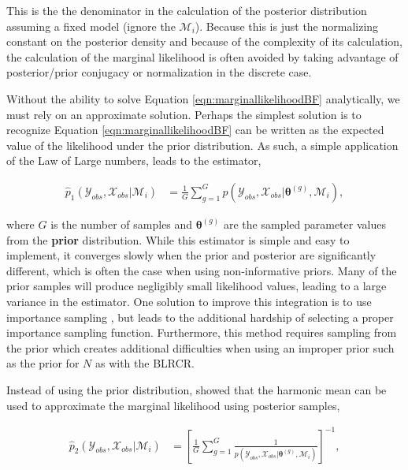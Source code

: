 \documentclass[
  12pt,
]{article}
\begin{document}
This is the the denominator in the calculation of the posterior
distribution assuming a fixed model (ignore the \(\mathcal{M}_i\)).
Because this is just the normalizing constant on the posterior density
and because of the complexity of its calculation, the calculation of the
marginal likelihood is often avoided by taking advantage of
posterior/prior conjugacy or normalization in the discrete case.

Without the ability to solve Equation \ref{eqn:marginallikelihoodBF}
analytically, we must rely on an approximate solution. Perhaps the
simplest solution is to recognize Equation
\ref{eqn:marginallikelihoodBF} can be written as the expected value of
the likelihood under the prior distribution. As such, a simple
application of the Law of Large numbers, leads to the estimator,

\vspace{-20px}

\begin{align}
\label{eqn:priorapproxBF}
\hat{p}_1(\mathcal{Y}_{obs},\mathcal{X}_{obs}|\mathcal{M}_i) & =\frac{1}{G}\sum_{g=1}^G p(\mathcal{Y}_{obs},\mathcal{X}_{obs}|\boldsymbol{\theta}^{(g)},\mathcal{M}_i),
\end{align} \vspace{-20px}

where \(G\) is the number of samples and \(\boldsymbol{\theta}^{(g)}\)
are the sampled parameter values from the \textbf{prior} distribution.
While this estimator is simple and easy to implement, it converges
slowly when the prior and posterior are significantly different, which
is often the case when using non-informative priors. Many of the prior
samples will produce negligibly small likelihood values, leading to a
large variance in the estimator. One solution to improve this
integration is to use importance sampling
\cite{kass_bayes_1995,robert_computational_2009}, but leads to the
additional hardship of selecting a proper importance sampling function.
Furthermore, this method requires sampling from the prior which creates
additional difficulties when using an improper prior such as the prior
for \(N\) as with the BLRCR.

Instead of using the prior distribution, \cite{newton_approximate_1994}
showed that the harmonic mean can be used to approximate the marginal
likelihood using posterior samples,

\vspace{-20px}

\begin{align}
\label{eqn:harmonicmeanBF}
\hat{p}_2(\mathcal{Y}_{obs},\mathcal{X}_{obs}|\mathcal{M}_i) & = \left[\frac{1}{G}\sum_{g=1}^G \frac{1}{p(\mathcal{Y}_{obs},\mathcal{X}_{obs}|\boldsymbol{\theta}^{(g)},\mathcal{M}_i)}\right]^{-1},
\end{align} \vspace{-20px}
\end{document}
